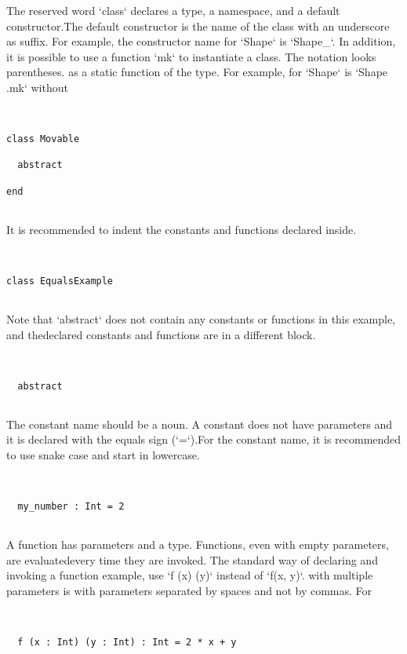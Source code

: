 \documentclass[12pt,a4paper]{article}
\begin{document}
The reserved word `class` declares a type, a namespace, and a default constructor.The default constructor is the name of the class with an underscore as suffix.
For example, the constructor name for `Shape` is `Shape_`.
In addition, it is possible to use a function `mk` to instantiate a class. The notation looks
parentheses. as a static function of the type. For example,  for `Shape` is `Shape .mk` without


\begin{lstlisting}


class Movable

  abstract

end


\end{lstlisting}

It is recommended to indent the constants and functions declared inside. 


\begin{lstlisting}


class EqualsExample


\end{lstlisting}

Note that `abstract` does not contain any constants or functions in this example, and thedeclared constants and functions are in a different block. 


\begin{lstlisting}


  abstract


\end{lstlisting}

The constant name should be a noun. A constant does not have parameters and it is declared with the equals sign (`=`).For the constant name, it is recommended to use snake case and start in lowercase.


\begin{lstlisting}


  my_number : Int = 2


\end{lstlisting}

A function has parameters and a type. Functions, even with empty parameters, are evaluatedevery time they are invoked. The standard way of declaring and invoking a function
example, use `f (x) (y)` instead of `f(x, y)`. with multiple parameters is with parameters separated by spaces and not by commas. For


\begin{lstlisting}


  f (x : Int) (y : Int) : Int = 2 * x + y


\end{lstlisting}
\end{document}
